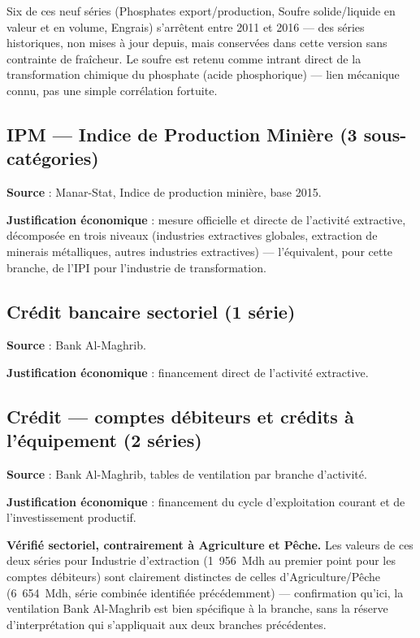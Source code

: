 \documentclass[11pt,a4paper]{article}
\begin{document}
\begin{noteboxbleu}
Six de ces neuf séries (Phosphates export/production, Soufre solide/liquide en valeur et en volume, Engrais) s'arrêtent entre 2011 et 2016 --- des séries historiques, non mises à jour depuis, mais conservées dans cette version sans contrainte de fraîcheur. Le soufre est retenu comme intrant direct de la transformation chimique du phosphate (acide phosphorique) --- lien mécanique connu, pas une simple corrélation fortuite.
\end{noteboxbleu}

\subsection{IPM --- Indice de Production Minière (3 sous-catégories)}

\textbf{Source} : Manar-Stat, Indice de production minière, base 2015.

\textbf{Justification économique} : mesure officielle et directe de l'activité extractive, décomposée en trois niveaux (industries extractives globales, extraction de minerais métalliques, autres industries extractives) --- l'équivalent, pour cette branche, de l'IPI pour l'industrie de transformation.

\subsection{Crédit bancaire sectoriel (1 série)}

\textbf{Source} : Bank Al-Maghrib.

\textbf{Justification économique} : financement direct de l'activité extractive.

\subsection{Crédit --- comptes débiteurs et crédits à l'équipement (2 séries)}

\textbf{Source} : Bank Al-Maghrib, tables de ventilation par branche d'activité.

\textbf{Justification économique} : financement du cycle d'exploitation courant et de l'investissement productif.

\begin{noteboxbleu}
\textbf{Vérifié sectoriel, contrairement à Agriculture et Pêche.} Les valeurs de ces deux séries pour Industrie d'extraction (1~956~Mdh au premier point pour les comptes débiteurs) sont clairement distinctes de celles d'Agriculture/Pêche (6~654~Mdh, série combinée identifiée précédemment) --- confirmation qu'ici, la ventilation Bank Al-Maghrib est bien spécifique à la branche, sans la réserve d'interprétation qui s'appliquait aux deux branches précédentes.
\end{noteboxbleu}
\end{document}
